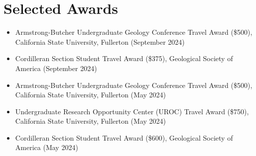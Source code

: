 \documentclass[11pt,a4paper,sans]{moderncv}
\begin{document}

\section{Selected Awards}
\begin{itemize}
\item Armstrong-Butcher Undergraduate Geology Conference Travel Award (\$500), California State University, Fullerton (September 2024)
\item Cordilleran Section Student Travel Award (\$375), Geological Society of America (September 2024)
\item Armstrong-Butcher Undergraduate Geology Conference Travel Award (\$500), California State University, Fullerton (May 2024)
\item Undergraduate Research Opportunity Center (UROC) Travel Award (\$750), California State University, Fullerton (May 2024)
\item Cordilleran Section Student Travel Award (\$600), Geological Society of America (May 2024)
\end{itemize}
\end{document}
